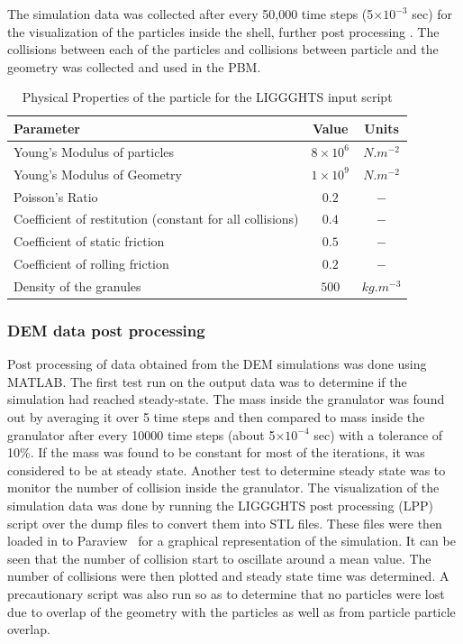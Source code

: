 \documentclass[preprint,11pt,authoryear]{elsarticle}
\begin{document}
The simulation data was collected after every 50,000 time steps (5$\times 10^{-3}$ sec) 
for the visualization of the particles inside the shell, further post processing . The collisions 
between each of the particles and collisions between particle and the geometry was 
collected and used in the PBM. 

\begin{table}
\caption{Physical Properties of the particle for the LIGGGHTS input script} 
\label{table:mthds_dem_input}
\begin{center}
\begin{tabular}{l|c|c}
\hline
\bf{Parameter} &\bf{Value} &\bf{Units}\\
\hline
Young's Modulus of particles  & $8 \times 10^{6}$ & $N.m^{-2}$\\
Young's Modulus of Geometry  & $1 \times 10^{9}$ & $N.m^{-2}$\\
Poisson's Ratio & $0.2$ & $-$\\
Coefficient of restitution (constant for all collisions) & $0.4$ & $-$\\
Coefficient of static friction & $0.5$ & $-$\\
Coefficient of rolling friction  & $0.2$ & $-$\\
Density of the granules & $500$ & $kg.m^{-3}$\\
\hline
\end{tabular}
\end{center}
\end{table}

\subsubsection{DEM data post processing}
Post processing of data obtained from the DEM simulations was done using MATLAB. 
The first test run on the output data was to determine if the simulation had reached steady-state. The 
mass inside the granulator was found out by averaging it over 5 time steps and then compared to 
mass inside the granulator after every 10000 time steps (about 5$\times 10^{-4}$ sec) with a 
tolerance of 10\%. If the mass was found to be constant for most of the iterations, it was 
considered to be at steady state. Another test to determine steady state was to monitor the number of 
collision inside the granulator. The visualization of the simulation data was done by running the 
LIGGGHTS post processing (LPP) script over the dump files to convert them into STL files. These 
files were then loaded in to Paraview~\citep{paraview2017} for a graphical 
representation of the 
simulation. It can be seen that the number of collision start to oscillate around a mean value. The 
number of collisions were then plotted and steady state time was determined.
A precautionary script was also run so as to determine that no particles were lost due to overlap 
of the geometry with the particles as well as from particle particle overlap.
\end{document}
